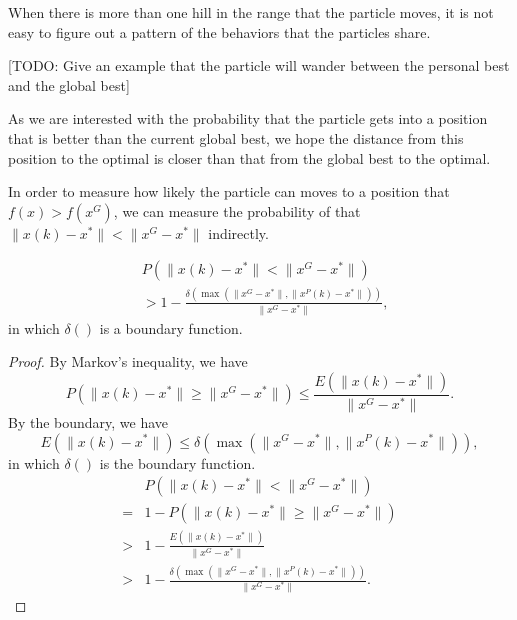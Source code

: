When there is more than one hill in the range that the particle moves, it is not easy to figure out a pattern of the behaviors that the particles share.

[TODO: Give an example that the particle will wander between the personal best and the global best]

As we are interested with the probability that the particle gets into a position that is better than the current global best, we hope the distance from this position to the optimal is closer than that from the global best to the optimal.

In order to measure how likely the particle can moves to a position that $ f(x) > f(x^{G}) $, we can measure the probability of that $ \lVert x(k) - x^{*} \rVert < \lVert x^{G} - x^{*} \rVert $ indirectly.

\begin{mylem}
\begin{equation}
\begin{aligned}
& P( \lVert x(k) - x^{*} \rVert < \lVert x^{G} - x^{*} \rVert ) \\
& > 1 - \frac{ \delta ( \max ( \lVert x^{G} - x^{*} \rVert , \lVert x^{P}(k) - x^{*}  \rVert ) ) }{ \lVert x^{G} - x^{*} \rVert },
\end{aligned}
\end{equation}
in which $ \delta () $ is a boundary function.
\begin{proof}
By Markov's inequality, we have
\begin{equation}
P( \lVert x(k) - x^{*} \rVert \geq \lVert x^{G} - x^{*} \rVert ) \leq \frac{ E( \lVert x(k) - x^{*} \rVert ) }{ \lVert x^{G} - x^{*} \rVert }.
\end{equation} 
By the boundary, we have
\begin{equation}
E( \lVert x(k) - x^{*} \rVert ) \leq \delta ( \max ( \lVert x^{G} - x^{*} \rVert , \lVert x^{P}(k) - x^{*}  \rVert ) ),
\end{equation}
in which $ \delta () $ is the boundary function.
\begin{equation}
\begin{aligned}
& P( \lVert x(k) - x^{*} \rVert < \lVert x^{G} - x^{*} \rVert ) \\
= & 1 - P( \lVert x(k) - x^{*} \rVert \geq \lVert x^{G} - x^{*} \rVert ) \\
> & 1 - \frac{ E( \lVert x(k) - x^{*} \rVert ) }{ \lVert x^{G} - x^{*} \rVert } \\
> & 1 - \frac{ \delta ( \max ( \lVert x^{G} - x^{*} \rVert , \lVert x^{P}(k) - x^{*}  \rVert ) ) }{ \lVert x^{G} - x^{*} \rVert }.
\end{aligned}
\end{equation}
\end{proof}
\end{mylem}

